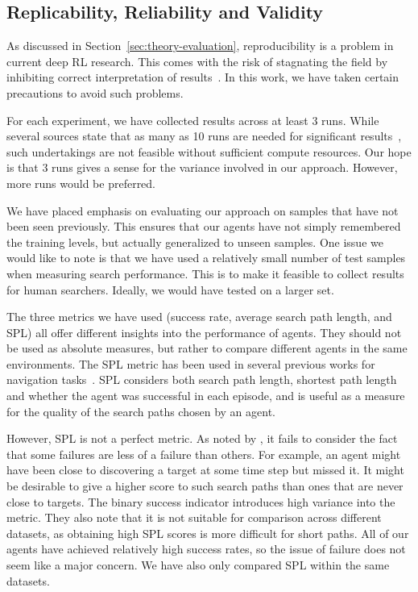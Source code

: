 \subsection{Replicability, Reliability and Validity}

As discussed in Section~\ref{sec:theory-evaluation}, reproducibility is a problem in current deep RL research.
This comes with the risk of stagnating the field by inhibiting correct interpretation of results~\cite{henderson_deep_2018}.
In this work, we have taken certain precautions to avoid such problems.

For each experiment, we have collected results across at least 3 runs.
While several sources state that as many as 10 runs are needed for significant results~\cite{colas_hitchhikers_2019,agarwal_deep_2022},
such undertakings are not feasible without sufficient compute resources.
Our hope is that 3 runs gives a sense for the variance involved in our approach.
However, more runs would be preferred.

We have placed emphasis on evaluating our approach on samples that have not been seen previously.
This ensures that our agents have not simply remembered the training levels, but actually generalized to unseen samples.
One issue we would like to note is that we have used a relatively small number of test samples when measuring search performance.
This is to make it feasible to collect results for human searchers.
Ideally, we would have tested on a larger set.

The three metrics we have used (success rate, average search path length, and SPL) all offer different insights into the performance of agents.
They should not be used as absolute measures, but rather to compare different agents in the same environments.
The SPL metric has been used in several previous works for navigation tasks~\cite{anderson_evaluation_2018,yang_visual_2018}.
SPL considers both search path length, shortest path length and whether the agent was successful in each episode,
and is useful as a measure for the quality of the search paths chosen by an agent.

However, SPL is not a perfect metric. As noted by \cite{batra_objectnav_2020}, it fails to consider the fact that some failures are less of a failure than others.
For example, an agent might have been close to discovering a target at some time step but missed it.
It might be desirable to give a higher score to such search paths than ones that are never close to targets.
The binary success indicator introduces high variance into the metric.
They also note that it is not suitable for comparison across different datasets, as obtaining high SPL scores is more difficult for short paths.
All of our agents have achieved relatively high success rates, so the issue of failure does not seem like a major concern.
We have also only compared SPL within the same datasets.

